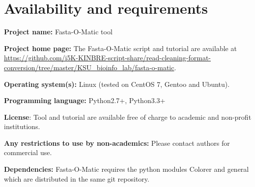 \section{Availability and requirements}
\textbf{Project name:} Fasta-O-Matic tool

\textbf{Project home page:} The Fasta-O-Matic script and tutorial are available at \url{https://github.com/i5K-KINBRE-script-share/read-cleaning-format-conversion/tree/master/KSU\_bioinfo\_lab/fasta-o-matic}. 

\textbf{Operating system(s):} Linux (tested on CentOS 7, Gentoo and Ubuntu).

\textbf{Programming language:} Python2.7+, Python3.3+

\textbf{License}: Tool and tutorial are available free of charge to academic and non-profit institutions.

\textbf{Any restrictions to use by non-academics:} Please contact authors for commercial use.

\textbf{Dependencies:} Fasta-O-Matic requires the python modules Colorer and general which are distributed in the same git repository.



  